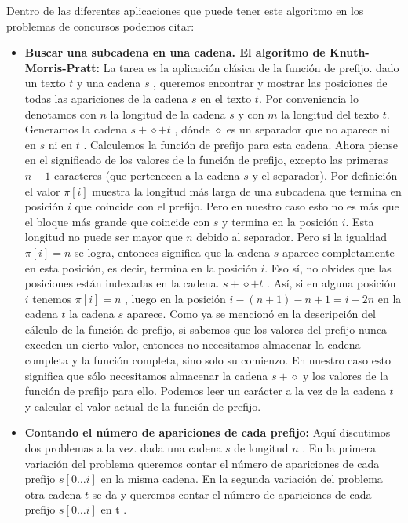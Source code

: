 Dentro de las diferentes aplicaciones que puede tener este algoritmo en los problemas de concursos podemos citar:

\begin{itemize}
	\item \textbf{Buscar una subcadena en una cadena. El algoritmo de Knuth-Morris-Pratt:} La tarea es la aplicación clásica de la función de prefijo. dado un texto $t$ y una cadena $s$ , queremos encontrar y mostrar las posiciones de todas las apariciones de la cadena $s$ en el texto $t$. Por conveniencia lo denotamos con $n$ la longitud de la cadena $s$ y con $m$ la longitud del texto $t$. Generamos la cadena $s+ \diamond + t$ , dónde $\diamond$ es un separador que no aparece ni en $s$ ni en $t$ . Calculemos la función de prefijo para esta cadena. Ahora piense en el significado de los valores de la función de prefijo, excepto las primeras $n + 1$ caracteres (que pertenecen a la cadena $s$ y el separador). Por
	definición el valor $\pi[i]$ muestra la longitud más larga de una subcadena que termina en posición $i$ que coincide con el prefijo. Pero en nuestro caso esto no es más que el bloque más grande que coincide con $s$ y termina en la posición $i$. Esta longitud no puede ser mayor que $n$ debido al separador. Pero si la igualdad $\pi[i] = n$ se logra, entonces significa que la cadena $s$ aparece completamente en esta posición, es decir, termina en la posición $i$. Eso sí, no olvides que las posiciones están indexadas en la cadena. $s + \diamond + t$ . Así, si en alguna posición $i$ tenemos $\pi[i] = n$ , luego en la posición $i-(n+ 1)-n+1=i-2n$ en la cadena $t$ la cadena $s$ aparece. Como ya se mencionó en la descripción del cálculo de la función de prefijo, si sabemos que los valores del prefijo nunca exceden un cierto valor, entonces no necesitamos almacenar la cadena completa y la función completa, sino solo su comienzo. En nuestro caso esto significa que sólo
	necesitamos almacenar la cadena $s + \diamond$ y los valores de la función de prefijo para ello. Podemos leer un carácter a la vez de la cadena $t$ y calcular el valor actual de la función de prefijo.
	
	\item \textbf{Contando el número de apariciones de cada prefijo:} Aquí discutimos dos problemas a la vez. dada una cadena $s$ de longitud $n$ . En la primera variación del problema queremos contar el número de apariciones de cada prefijo $s[0 \dots i]$ en la misma cadena. En la segunda variación del problema otra cadena $t$ se da y queremos contar el número de apariciones de cada prefijo $s[0 \dots i]$ en t .
	

\end{itemize}
